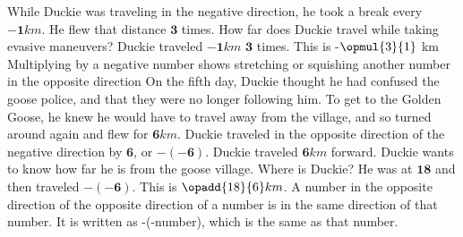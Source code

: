 {}
{While Duckie was traveling in the negative direction, he took a break every $\mathbf{-1} km$. He flew that distance  $\mathbf{3}$ times. How far does Duckie travel while taking evasive maneuvers?}
{Duckie traveled $\mathbf{-1} km$ $\mathbf{3}$ times. This is -$\opmul{3}{1}$ km}
{Multiplying by a negative number shows stretching or squishing another number in the opposite direction}
{}
{On the fifth day, Duckie thought he had confused the goose police, and that they were no longer following him. To get to the Golden Goose, he knew he would have to travel away from the village, and so turned around again and flew for $\mathbf{6} km$. Duckie traveled in the opposite direction of the negative direction by $\mathbf{6}$, or $\mathbf{-(-6)}$. Duckie traveled $\mathbf{6} km$ forward. Duckie wants to know how far he is from the goose village. Where is Duckie?}
{He was at $\mathbf{18}$ and then traveled $\mathbf{-(-6)}$. This is $\opadd{18}{6} km$.}
{A number in the opposite direction of the opposite direction of a number is in the same direction of that number. It is written as -(-number), which is the same as  that number.}
{}
